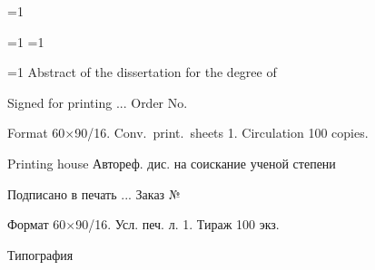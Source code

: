 \documentclass[a4paper,14pt,oneside,openany,article]{memoir}
\begin{document}
\ifnum\value{thesislang}=1
  \gappto\captionsenglish{}%
\else
  \gappto\captionsrussian{}%
\fi


\ifnum\value{thesislang}=1 \fi
\ifnum\value{thesislang}=1
  \newpage
\fi
\mainmatter*                  %

\newpage\thispagestyle{empty}

\vspace*{0pt plus1fill}

\small
\begin{center}
    \textit{\thesisAuthor}
    \par\medskip

    \thesisTitle
    \par\medskip

    \ifnum\value{thesislang}=1
    Abstract of the dissertation for the degree of \thesisDegreeShort
    \par\bigskip

    Signed for printing \blank[\widthof{999}].\blank[\widthof{999}].\blank[\widthof{99999}].
    Order No.~\blank[\widthof{999999999999}]

    Format 60\(\times\)90/16. Conv.\ print.\ sheets 1. Circulation 100 copies.

    Printing house \blank[0.5\linewidth]
    \else
    Автореф. дис. на соискание ученой степени \thesisDegreeShort
    \par\bigskip

    Подписано в печать \blank[\widthof{999}].\blank[\widthof{999}].\blank[\widthof{99999}].
    Заказ № \blank[\widthof{999999999999}]

    Формат 60\(\times\)90/16. Усл. печ. л. 1. Тираж 100 экз.

    Типография \blank[0.5\linewidth]
    \fi
\end{center}
\cleardoublepage
\end{document}

